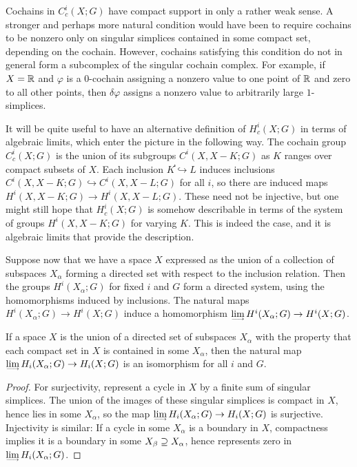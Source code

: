 Cochains in $C^i_c(X;G)$ have compact support in only a rather weak sense. A
stronger and perhaps more natural condition would have been to require cochains to be nonzero only on singular simplices contained in some compact set, depending on the cochain. However, cochains satisfying this condition do not in general form a subcomplex of the singular cochain complex. For example, if $X=\mathbb{R}$ and $\varphi$ is a $0$-cochain assigning a nonzero value to one point of $\mathbb{R}$ and zero to all other points, then $\delta\varphi$ assigns a nonzero value to arbitrarily large $1$-simplices.\par
It will be quite useful to have an alternative definition of $H^i_c(X;G)$ in terms of algebraic limits, which enter the picture in the following way. The cochain group $C^i_c(X;G)$ is the union of its subgroups $C^i(X,X-K;G)$ as $K$ ranges over compact subsets of $X$. Each inclusion $K֓\hookrightarrow L$ induces inclusions $C^i(X,X-K;G)\hookrightarrow C^i(X,X-L;G)$ for all $i$, so there are induced maps $H^i(X,X-K;G)\to H^i(X,X-L;G)$. These need not be injective, but one might still hope that $H^i_c(X;G)$ is somehow describable in terms of the system of groups $H^i(X,X-K;G)$ for varying $K$. This is indeed the case, and it is algebraic limits that provide the description.\par
Suppose now that we have a space $X$ expressed as the union of a collection of
subspaces $X_\alpha$ forming a directed set with respect to the inclusion relation. Then the groups $H^i(X_\alpha;G)$ for fixed $i$ and $G$ form a directed system, using the homomorphisms induced by inclusions. The natural maps $H^i(X_\alpha;G)\to H^i(X;G)$ induce a homomorphism $\rlim H^i(X_\alpha;G)\to H^i(X;G)$.
\begin{proposition}\label{homology limit}
If a space $X$ is the union of a directed set of subspaces $X_\alpha$ with the property that each compact set in $X$ is contained in some $X_\alpha$, then the natural map $\rlim H_i(X_\alpha;G)\to H_i(X;G)$ is an isomorphism for all $i$ and $G$.
\end{proposition}
\begin{proof}
For surjectivity, represent a cycle in $X$ by a finite sum of singular simplices. The union of the images of these singular simplices is compact in $X$, hence lies in some $X_\alpha$, so the map $\rlim H_i(X_\alpha;G)\to H_i(X;G)$ is surjective. Injectivity is similar: If a cycle in some $X_\alpha$ is a boundary in $X$, compactness implies it is a boundary in some $X_\beta\supseteq X_\alpha$, hence represents zero in $\rlim H_i(X_\alpha;G)$.
\end{proof}
